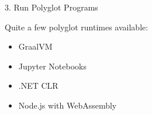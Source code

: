 \begin{roundedbeamerblock}{3. Run Polyglot Programs}


    \vspace{5mm}
    Quite a few polyglot runtimes available:
    \vspace{2mm}
    \begin{itemize}
        \item GraalVM
        \vspace{5mm}
        \item Jupyter Notebooks
        \vspace{5mm}
        \item .NET CLR
        \vspace{5mm}
        \item Node.js with WebAssembly
    \end{itemize}

\end{roundedbeamerblock}
